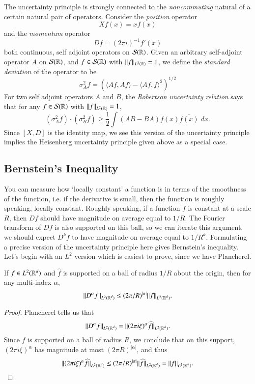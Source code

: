 The uncertainty principle is strongly connected to the \emph{noncommuting} natural of a certain natural pair of operators. Consider the \emph{position} operator
%
\[ Xf(x) = x f(x) \]
%
and the \emph{momentum} operator
%
\[ Df = (2 \pi i)^{-1} f'(x) \]
%
both continuous, self adjoint operators on $\mathcal{S}(\operatorname{\mathbb{R}})$. Given an arbitrary self-adjoint operator $A$ on $\mathcal{S}(\operatorname{\mathbb{R}})$, and $f \in \mathcal{S}(\operatorname{\mathbb{R}})$ with $\| f \|_{L^2(\operatorname{\mathbb{R}})} = 1$, we define the \emph{standard deviation} of the operator to be
%
\[ \sigma_A^2 f = \left( \langle Af, Af \rangle - \langle Af, f \rangle^2 \right)^{1/2} \]
%
%
For two self adjoint operators $A$ and $B$, the \emph{Robertson uncertainty relation} says that for any $f \in \mathcal{S}(\operatorname{\mathbb{R}})$ with $\| f \|_{L^2(\operatorname{\mathbb{R}})} = 1$,
%
\[ (\sigma_A^2 f) \cdot (\sigma_B^2 f) \geq \frac{1}{2} \int (AB - BA)f(x) \overline{f(x)}\; dx. \]
%
Since $[X,D]$ is the identity map, we see this version of the uncertainty principle implies the Heisenberg uncertainty principle given above as a special case.


\subsection{Bernstein's Inequality}

You can measure how `locally constant' a function is in terms of the smoothness of the function, i.e. if the derivative is small, then the function is roughly speaking, locally constant. Roughly speaking, if a function $f$ is constant at a scale $R$, then $Df$ should have magnitude on average equal to $1/R$. The Fourier transform of $Df$ is also supported on this ball, so we can iterate this argument, we should expect $D^kf$ to have magnitude on average equal to $1/R^k$. Formulating a precise version of the uncertainty principle here gives Bernstein's inequality. Let's begin with an $L^2$ version which is easiest to prove, since we have Plancherel.

\begin{lemma}
    If $f \in L^2(\operatorname{\mathbb{R}}^d)$ and $\widehat{f}$ is supported on a ball of radius $1/R$ about the origin, then for any multi-index $\alpha$,
    \[ \| D^\alpha f \|_{L^2(\operatorname{\mathbb{R}}^d)} \leq (2 \pi / R)^{|\alpha|} \| f \|_{L^2(\operatorname{\mathbb{R}}^d)}. \]
\end{lemma}
\begin{proof}
    Plancherel tells us that
    \[ \| D^\alpha f \|_{L^2(\operatorname{\mathbb{R}}^d)} = \| (2 \pi i \xi)^\alpha \widehat{f} \|_{L^2(\operatorname{\mathbb{R}}^d)}. \]
    Since $\widehat{f}$ is supported on a ball of radius $R$, we conclude that on this support, $(2 \pi i \xi)^\alpha$ has magnitude at most $(2 \pi R)^{|\alpha|}$, and thus
    \[ \| (2 \pi i \xi)^\alpha \widehat{f} \|_{L^2(\operatorname{\mathbb{R}}^d)} \leq (2 \pi / R)^{|\alpha|} \| \widehat{f} \|_{L^2(\operatorname{\mathbb{R}}^d)} = \| f \|_{L^2(\operatorname{\mathbb{R}}^d)}. \qedhere \]
\end{proof}

